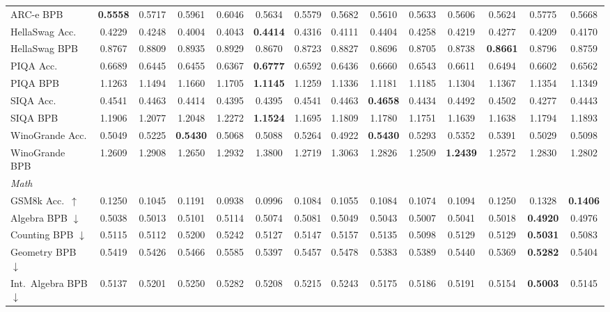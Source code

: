 \documentclass[11pt]{article}
\begin{document}
\begin{table}[t]
{\begin{tabular}{lccccccccccccc}
\quad ARC-e BPB & \textbf{0.5558} & 0.5717 & 0.5961 & 0.6046 & 0.5634 & 0.5579 & 0.5682 & 0.5610 & 0.5633 & 0.5606 & 0.5624 & 0.5775 & 0.5668 \\
\quad HellaSwag Acc. & 0.4229 & 0.4248 & 0.4004 & 0.4043 & \textbf{0.4414} & 0.4316 & 0.4111 & 0.4404 & 0.4258 & 0.4219 & 0.4277 & 0.4209 & 0.4170 \\
\quad HellaSwag BPB & 0.8767 & 0.8809 & 0.8935 & 0.8929 & 0.8670 & 0.8723 & 0.8827 & 0.8696 & 0.8705 & 0.8738 & \textbf{0.8661} & 0.8796 & 0.8759 \\
\quad PIQA Acc. & 0.6689 & 0.6445 & 0.6455 & 0.6367 & \textbf{0.6777} & 0.6592 & 0.6436 & 0.6660 & 0.6543 & 0.6611 & 0.6494 & 0.6602 & 0.6562 \\
\quad PIQA BPB & 1.1263 & 1.1494 & 1.1660 & 1.1705 & \textbf{1.1145} & 1.1259 & 1.1336 & 1.1181 & 1.1185 & 1.1304 & 1.1367 & 1.1354 & 1.1349 \\
\quad SIQA Acc. & 0.4541 & 0.4463 & 0.4414 & 0.4395 & 0.4395 & 0.4541 & 0.4463 & \textbf{0.4658} & 0.4434 & 0.4492 & 0.4502 & 0.4277 & 0.4443 \\
\quad SIQA BPB & 1.1906 & 1.2077 & 1.2048 & 1.2272 & \textbf{1.1524} & 1.1695 & 1.1809 & 1.1780 & 1.1751 & 1.1639 & 1.1638 & 1.1794 & 1.1893 \\
\quad WinoGrande Acc. & 0.5049 & 0.5225 & \textbf{0.5430} & 0.5068 & 0.5088 & 0.5264 & 0.4922 & \textbf{0.5430} & 0.5293 & 0.5352 & 0.5391 & 0.5029 & 0.5098 \\
\quad WinoGrande BPB & 1.2609 & 1.2908 & 1.2650 & 1.2932 & 1.3800 & 1.2719 & 1.3063 & 1.2826 & 1.2509 & \textbf{1.2439} & 1.2572 & 1.2830 & 1.2802 \\
\midrule
\multicolumn{14}{l}{\textit{Math}} \\
\quad GSM8k Acc.\ $\uparrow$ & 0.1250 & 0.1045 & 0.1191 & 0.0938 & 0.0996 & 0.1084 & 0.1055 & 0.1084 & 0.1074 & 0.1094 & 0.1250 & 0.1328 & \textbf{0.1406} \\
\quad Algebra BPB $\downarrow$ & 0.5038 & 0.5013 & 0.5101 & 0.5114 & 0.5074 & 0.5081 & 0.5049 & 0.5043 & 0.5007 & 0.5041 & 0.5018 & \textbf{0.4920} & 0.4976 \\
\quad Counting BPB $\downarrow$ & 0.5115 & 0.5112 & 0.5200 & 0.5242 & 0.5127 & 0.5147 & 0.5157 & 0.5135 & 0.5098 & 0.5129 & 0.5129 & \textbf{0.5031} & 0.5083 \\
\quad Geometry BPB $\downarrow$ & 0.5419 & 0.5426 & 0.5466 & 0.5585 & 0.5397 & 0.5457 & 0.5478 & 0.5383 & 0.5389 & 0.5440 & 0.5369 & \textbf{0.5282} & 0.5404 \\
\quad Int.\ Algebra BPB $\downarrow$ & 0.5137 & 0.5201 & 0.5250 & 0.5282 & 0.5208 & 0.5215 & 0.5243 & 0.5175 & 0.5186 & 0.5191 & 0.5154 & \textbf{0.5003} & 0.5145 \\

\end{tabular}}
\end{table}
\end{document}

